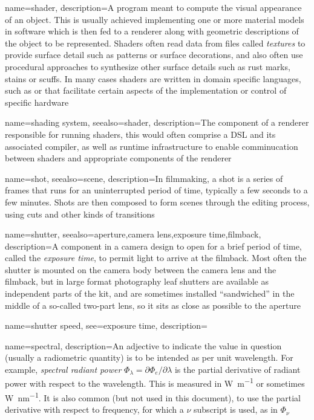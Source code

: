 {
	name={shader},
	description={A program meant to compute the visual appearance of an object. 
		This is usually achieved implementing one or more material models in 
		software which is then fed to a renderer along with geometric descriptions
		of the object to be represented.
		Shaders often read data from files called \textsl{textures} to provide 
		surface detail such as patterns or surface decorations, 
		and also often use procedural approaches to synthesize other surface
		details such as rust marks, stains or scuffs.
		In many cases shaders are written in domain specific languages, such as 
		 or  that facilitate certain aspects of the 
		implementation or control of specific hardware}
}

{
	name={shading system},
	seealso={shader},
	description={The component of a renderer responsible for running \glspl{shader},
		this would often comprise a \gls{DSL} and its associated compiler, as well as
		runtime infrastructure to enable comminucation between \glspl{shader} and
		appropriate components of the renderer
	}
}

{
	name={shot},
	seealso={scene},
	description={In filmmaking, a shot is a series of frames that runs for an uninterrupted
		period of time, typically a few seconds to a few minutes. Shots are then composed
		to form scenes through the editing process, using cuts and other kinds of transitions}
}

{
	name={shutter},
	seealso={aperture,camera lens,exposure time,filmback},
	description={A component in a camera design to open for a brief period of time, called the 
		\textsl{exposure time}, to permit light to arrive at the filmback. 
		Most often the shutter is mounted on the camera body between the camera lens 
		and the filmback, but in large format photography leaf shutters are available as 
		independent parts of the kit, and are sometimes installed ``sandwiched'' in the
		middle of a so-called two-part lens, so it sits as close as possible to the
		aperture}
}

{    
	name={shutter speed},
	see={exposure time},
	description=\nopostdesc
}

{    
	name={spectral},
	description={An adjective to indicate the value in question (usually a radiometric quantity)
		is to be intended as per unit wavelength. For example, \textsl{spectral radiant power}
		$\Phi_\lambda = \partial\Phi_e / \partial\lambda$ is the partial derivative of 
		radiant power with respect to the wavelength. This is measured in 
		\unit{\watt\per\meter} or sometimes \unit{\watt\per\nano\meter}.
		It is also common (but not used in this document), to use the partial derivative
		with respect to frequency, for which a $\nu$ subscript is used, as in $\Phi_\nu$}
}

